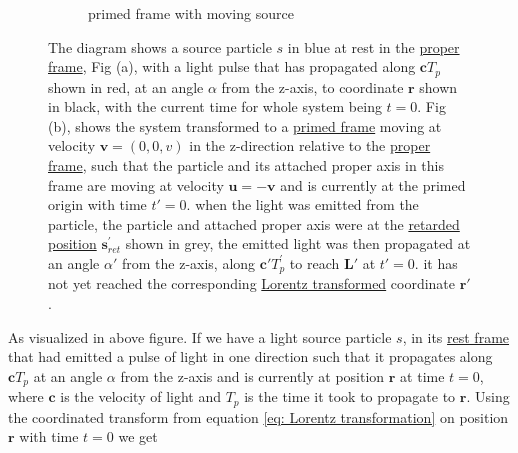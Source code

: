 \begin{figure}[H]
\begin{subfigure}{.49\textwidth}
		\caption{primed frame with moving source}
		\label{fig: primed frame 1}
	\end{subfigure}
	\caption{The diagram shows a source particle ${s}$ in blue at rest in the \protect\hyperlink{def-proper-frame}{proper frame}, Fig (a), with a light pulse that has propagated along $\mathbf{c} {T}_{p}$ shown in red, at an angle $\alpha$ from the z-axis, to coordinate $\mathbf{r}$ shown in black, with the current time for whole system being ${t} = 0$. Fig (b), shows the system transformed to a \protect\hyperlink{def-Primed-Frame}{primed frame} moving at velocity $\mathbf{v} = (0,0,v)$ in the z-direction relative to the \protect\hyperlink{def-proper-frame}{proper frame}, such that the particle and its attached proper axis in this frame are moving at velocity $\mathbf{u} =-\mathbf{v}$ and is currently at the primed origin with time ${t{'}} = 0$. when the light was emitted from the particle, the particle and attached proper axis were at the \protect\hyperlink{def-retarded-position}{retarded position} $\mathbf{s}_{ret}^{'}$ shown in grey, the emitted light was then propagated at an angle $\alpha{'}$ from the z-axis, along $\mathbf{c}{'} {T}_{p}^{'}$ to reach $\mathbf{L}{'}$ at ${t{'}} = 0$. it has not yet reached the corresponding \protect\hyperlink{def-lorentz-transform}{Lorentz transformed} coordinate $\mathbf{r}{'}$.}
	\label{fig: appendix Retarded field outward field transform}
\end{figure}



As visualized in above figure.
If we have a light source particle ${s}$, in its \hyperlink{def-proper-frame}{rest frame} that had emitted a pulse of light in one direction such that it propagates along $\mathbf{c} {T}_{p}$ at an angle $\alpha$ from the z-axis and is currently at position $\mathbf{r}$ at time ${t} = 0$, where $\mathbf{c}$ is the velocity of light and ${T}_{p}$ is the time it took to propagate to $\mathbf{r}$.
Using the coordinated transform from equation \eqref{eq: Lorentz transformation} on position $\mathbf{r}$ with time ${t} = 0$ we get

